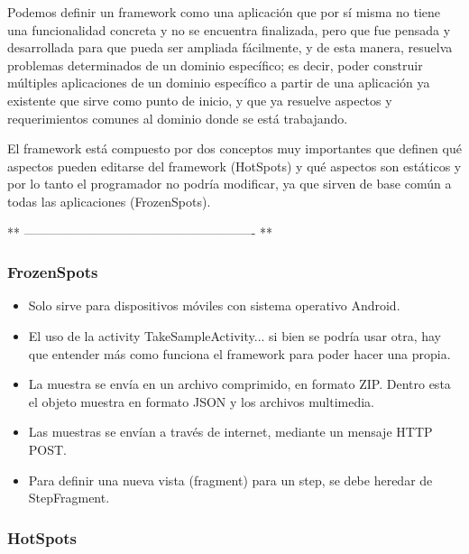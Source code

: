 Podemos definir un framework como una aplicación que por sí misma no tiene una funcionalidad concreta y no se encuentra finalizada, pero que fue pensada y desarrollada para que pueda ser ampliada fácilmente, y de esta manera, resuelva problemas determinados de un dominio específico; es decir, poder construir múltiples aplicaciones de un dominio específico a partir de una aplicación ya existente que sirve como punto de inicio, y que ya resuelve aspectos y requerimientos comunes al dominio donde se está trabajando.

El framework está compuesto por dos conceptos muy importantes que definen qué aspectos pueden editarse del framework (HotSpots) y qué aspectos son estáticos y por lo tanto el programador no podría modificar, ya que sirven de base común a todas las aplicaciones (FrozenSpots).

** ------------------------------------------------------- **

\subsubsection{FrozenSpots}

\begin{itemize}
	\item Solo sirve para dispositivos móviles con sistema operativo Android.
	\item El uso de la activity TakeSampleActivity... si bien se podría usar otra, hay que entender más como funciona el framework para poder hacer una propia.
	\item La muestra se envía en un archivo comprimido, en formato ZIP. Dentro esta el objeto muestra en formato JSON y los archivos multimedia.
	\item Las muestras se envían a través de internet, mediante un mensaje HTTP POST.
	\item Para definir una nueva vista (fragment) para un step, se debe heredar de StepFragment.
\end{itemize}

\subsubsection{HotSpots}

